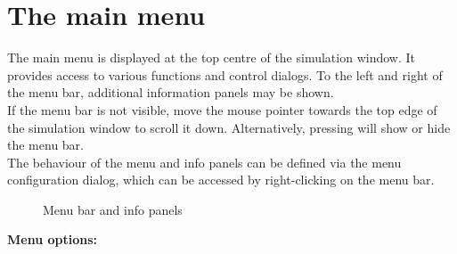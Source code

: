 \documentclass[Orbiter User Manual.tex]{subfiles}
\begin{document}
\section{The main menu}
The main menu is displayed at the top centre of the simulation window. It provides access to various functions and control dialogs. To the left and right of the menu bar, additional information panels may be shown.\\
If the menu bar is not visible, move the mouse pointer towards the top edge of the simulation window to scroll it down. Alternatively, pressing  will show or hide the menu bar.\\
The behaviour of the menu and info panels can be defined via the menu configuration dialog, which can be accessed by right-clicking on the menu bar.

\begin{figure}[H]
	\centering
	\caption{Menu bar and info panels}
\end{figure}

\noindent
\textbf{Menu options:}
\end{document}

